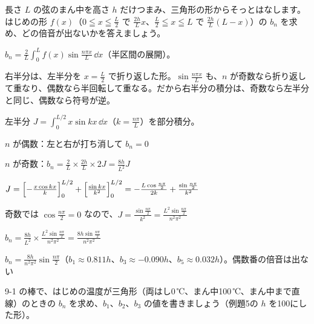 \begin{reidai}[まん中ではじいた弦]
長さ $L$ の弦のまん中を高さ $h$ だけつまみ、三角形の形からそっとはなします。はじめの形 $f(x)$（$0\leqq x\leqq\frac{L}{2}$ で $\frac{2h}{L}x$、$\frac{L}{2}\leqq x\leqq L$ で $\frac{2h}{L}(L-x)$）の $b_n$ を求め、どの倍音が出ないかを答えましょう。\par
\kangaekata {}\par
{}\enspace $b_n=\frac{2}{L}\int_0^Lf(x)\sin\frac{n\pi x}{L}\,\dd x$（半区間の展開）。\par
{}\enspace 右半分は、左半分を $x=\frac{L}{2}$ で折り返した形。$\sin\frac{n\pi x}{L}$ も、$n$ が奇数なら折り返して重なり、偶数なら半回転して重なる。だから右半分の積分は、奇数なら左半分と同じ、偶数なら符号が逆。\par
{}\enspace 左半分 $J=\int_0^{L/2}x\sin kx\,\dd x$（$k=\frac{n\pi}{L}$）を部分積分。\par
\shiki\kixcs $n$ が偶数：左と右が打ち消して $b_n=0$\par
\kixca $n$ が奇数：$b_n=\frac{2}{L}\times\frac{2h}{L}\times2J=\frac{8h}{L^2}J$\par
\kixca $J=\Bigl[-\frac{x\cos kx}{k}\Bigr]_0^{L/2}+\Bigl[\frac{\sin kx}{k^2}\Bigr]_0^{L/2}=-\frac{L\cos\frac{n\pi}{2}}{2k}+\frac{\sin\frac{n\pi}{2}}{k^2}$\par
\kixca 奇数では $\cos\frac{n\pi}{2}=0$ なので、$J=\frac{\sin\frac{n\pi}{2}}{k^2}=\frac{L^2\sin\frac{n\pi}{2}}{n^2\pi^2}$\par
\kixca $b_n=\frac{8h}{L^2}\times\frac{L^2\sin\frac{n\pi}{2}}{n^2\pi^2}=\frac{8h\sin\frac{n\pi}{2}}{n^2\pi^2}$\par
\kotae $b_n=\frac{8h}{n^2\pi^2}\sin\frac{n\pi}{2}$（$b_1\approx0.811h$、$b_3\approx-0.090h$、$b_5\approx0.032h$）。偶数番の倍音は出ない
\end{reidai}

\begin{jibun}
9-1 の棒で、はじめの温度が三角形（両はし0\,℃、まん中100\,℃、まん中まで直線）のときの $b_n$ を求め、$b_1$、$b_2$、$b_3$ の値を書きましょう（例題5の $h$ を100にした形）。
\end{jibun}

